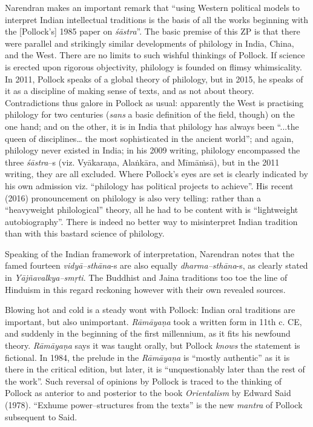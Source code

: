 Narendran makes an important remark that “using Western political models to interpret Indian intellectual traditions is the basis of all the works beginning with the [Pollock’s] 1985 paper on \textit{śāstra}”. The basic premise of this ZP is that there were parallel and strikingly similar developments of philology in India, China, and the West. There are no limits to such wishful thinkings of Pollock. If science is erected upon rigorous objectivity, philology is founded on flimsy whimsicality. In 2011, Pollock speaks of a global theory of philology, but in 2015, he speaks of it as a discipline of making sense of texts, and as not about theory. Contradictions thus galore in Pollock as usual: apparently the West is practising philology for two centuries (\textit{sans} a basic definition of the field, though) on the one hand; and on the other, it is in India that philology has always been “...the queen of disciplines… the most sophisticated in the ancient world”; and again, philology never existed in India; in his 2009 writing, philology encompassed the three \textit{śāstra}–s (viz. Vyākaraṇa, Alaṅkāra, and Mīmāṁsā), but in the 2011 writing, they are all excluded. Where Pollock’s eyes are set is clearly indicated by his own admission viz. “philology has political projects to achieve”. His recent (2016) pronouncement on philology is also very telling: rather than a “heavyweight philological” theory, all he had to be content with is “lightweight autobiography”. There is indeed no better way to misinterpret Indian tradition than with this bastard science of philology.

Speaking of the Indian framework of interpretation, Narendran notes that the famed fourteen \textit{vidyā–sthāna}-s are also equally \textit{dharma–sthāna}-s, as clearly stated in \textit{Yājñavalkya–smṛti}. The Buddhist and Jaina traditions too toe the line of Hinduism in this regard reckoning however with their own revealed sources.


Blowing hot and cold is a steady wont with Pollock: Indian oral traditions are important, but also unimportant. \textit{Rāmāyaṇa} took a written form in 11th c. CE, and suddenly in the beginning of the first millennium, as it fits his newfound theory. \textit{Rāmāyaṇa} says it was taught orally, but Pollock \textit{knows} the statement is fictional. In 1984, the prelude in the \textit{Rāmāyaṇa} is “mostly authentic” as it is there in the critical edition, but later, it is “unquestionably later than the rest of the work”. Such reversal of opinions by Pollock is traced to the thinking of Pollock as anterior to and posterior to the book \textit{Orientalism} by Edward Said (1978). “Exhume power–structures from the texts” is the new \textit{mantra} of Pollock subsequent to Said.

